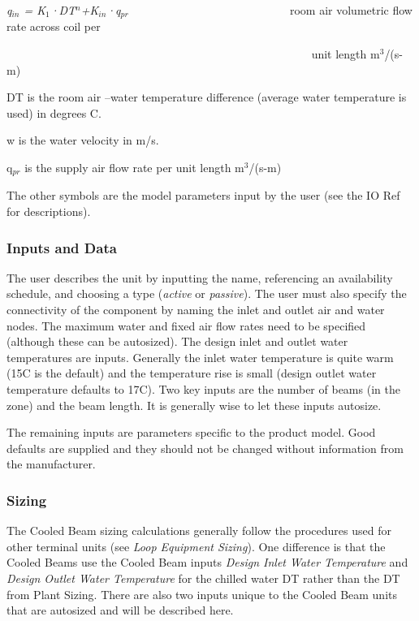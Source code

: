 \emph{q\(_{in}\) = K\(_{1}\)·DT\(^{n}\)+K\(_{in}\)·q\(_{pr}\)}~~~~~~~~~~~~~~~~ ~~~~~~~~~~~ room air volumetric flow rate across coil per

~~~~~~~~~~~~~~~~~~~~~~~~~~~~~~~~~~~~~~~~~~~~~~~~~~~~~ unit length m\(^{3}\)/(s-m)

DT is the room air --water temperature difference (average water temperature is used) in degrees C.

w is the water velocity in m/s.

q\(_{pr}\) is the supply air flow rate per unit length m\(^{3}\)/(s-m)

The other symbols are the model parameters input by the user (see the IO Ref for descriptions).

\subsubsection{Inputs and Data}\label{inputs-and-data-3}

The user describes the unit by inputting the name, referencing an availability schedule, and choosing a type (\emph{active} or \emph{passive}). The user must also specify the connectivity of the component by naming the inlet and outlet air and water nodes. The maximum water and fixed air flow rates need to be specified (although these can be autosized). The design inlet and outlet water temperatures are inputs. Generally the inlet water temperature is quite warm (15C is the default) and the temperature rise is small (design outlet water temperature defaults to 17C). Two key inputs are the number of beams (in the zone) and the beam length. It is generally wise to let these inputs autosize.

The remaining inputs are parameters specific to the product model. Good defaults are supplied and they should not be changed without information from the manufacturer.

\subsubsection{Sizing}\label{sizing}

The Cooled Beam sizing calculations generally follow the procedures used for other terminal units (see \emph{Loop Equipment Sizing}). One difference is that the Cooled Beams use the Cooled Beam inputs \emph{Design Inlet Water Temperature} and \emph{Design Outlet Water Temperature} for the chilled water DT rather than the DT from Plant Sizing. There are also two inputs unique to the Cooled Beam units that are autosized and will be described here.

